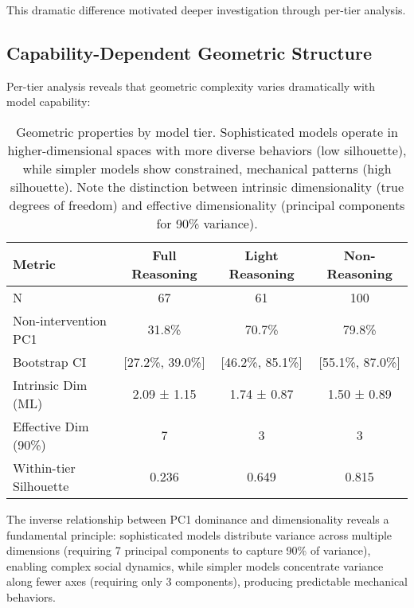 \documentclass[11pt,letterpaper]{article}
\newcommand{\fullReasoningCount}{67}
\newcommand{\lightReasoningCount}{61}
\newcommand{\nonReasoningCount}{100}
\newcommand{\fullReasoningPCOne}{31.8\%}
\newcommand{\fullReasoningPCOneCI}{[27.2\%, 39.0\%]}
\newcommand{\lightReasoningPCOne}{70.7\%}
\newcommand{\lightReasoningPCOneCI}{[46.2\%, 85.1\%]}
\newcommand{\noReasoningPCOne}{79.8\%}
\newcommand{\noReasoningPCOneCI}{[55.1\%, 87.0\%]}
\newcommand{\fullReasoningIntrinsicDim}{2.09}
\newcommand{\fullReasoningIntrinsicDimStd}{1.15}
\newcommand{\lightReasoningIntrinsicDim}{1.74}
\newcommand{\lightReasoningIntrinsicDimStd}{0.87}
\newcommand{\noReasoningIntrinsicDim}{1.50}
\newcommand{\noReasoningIntrinsicDimStd}{0.89}
\newcommand{\fullReasoningPCANinety}{7}
\newcommand{\lightReasoningPCANinety}{3}
\newcommand{\noReasoningPCANinety}{3}
\newcommand{\fullReasoningSilhouette}{0.236}
\newcommand{\lightReasoningSilhouette}{0.649}
\newcommand{\noReasoningSilhouette}{0.815}
\begin{document}
This dramatic difference motivated deeper investigation through per-tier analysis.

\subsection{Capability-Dependent Geometric Structure}

Per-tier analysis reveals that geometric complexity varies dramatically with model capability:

\begin{table}[h]
\centering
\begin{tabular}{lccc}
\toprule
Metric & Full Reasoning & Light Reasoning & Non-Reasoning \\
\midrule
N & \fullReasoningCount{} & \lightReasoningCount{} & \nonReasoningCount{} \\
Non-intervention PC1 & \fullReasoningPCOne{} & \lightReasoningPCOne{} & \noReasoningPCOne{} \\
Bootstrap CI & \fullReasoningPCOneCI{} & \lightReasoningPCOneCI{} & \noReasoningPCOneCI{} \\
Intrinsic Dim (ML) & \fullReasoningIntrinsicDim{} ± \fullReasoningIntrinsicDimStd{} & \lightReasoningIntrinsicDim{} ± \lightReasoningIntrinsicDimStd{} & \noReasoningIntrinsicDim{} ± \noReasoningIntrinsicDimStd{} \\
Effective Dim (90\%) & \fullReasoningPCANinety{} & \lightReasoningPCANinety{} & \noReasoningPCANinety{} \\
Within-tier Silhouette & \fullReasoningSilhouette{} & \lightReasoningSilhouette{} & \noReasoningSilhouette{} \\
\bottomrule
\end{tabular}
\caption{Geometric properties by model tier. Sophisticated models operate in higher-dimensional spaces with more diverse behaviors (low silhouette), while simpler models show constrained, mechanical patterns (high silhouette). Note the distinction between intrinsic dimensionality (true degrees of freedom) and effective dimensionality (principal components for 90\% variance).}
\label{tab:tier_geometry}
\end{table}

The inverse relationship between PC1 dominance and dimensionality reveals a fundamental principle: sophisticated models distribute variance across multiple dimensions (requiring \fullReasoningPCANinety{} principal components to capture 90\% of variance), enabling complex social dynamics, while simpler models concentrate variance along fewer axes (requiring only \noReasoningPCANinety{} components), producing predictable mechanical behaviors.
\end{document}
